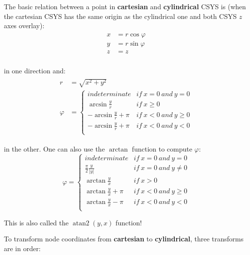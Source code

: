 \documentclass[10pt,b5paper,titlepage]{book}
\DeclareMathOperator{\atantwo}{atan2}
\newenvironment{eqarray}
{
    \begin{eqnarray}
        \begin{aligned}
}
{
        \end{aligned}
    \end{eqnarray}
}
\begin{document}
The basic relation between a point in \textbf{cartesian} and \textbf{cylindrical}
CSYS is (when the cartesian CSYS has the same origin as the cylindrical one
and both CSYS $ z $ axes overlay):
\begin{eqarray}
    x &= r \cos \varphi \\
    y &= r \sin \varphi \\
    z &= z \\
\end{eqarray}

 in one direction and:
 \begin{eqarray}
     r &= \sqrt{x^2 + y^2} \\
     \varphi &= \left\{ \begin{array}{cc}
                indeterminate & if\ x = 0\ and\ y = 0 \\
                \arcsin \frac{y}{r} & if\ x \ge 0 \\
                -\arcsin \frac{y}{r} + \pi & if\ x < 0\ and\ y \ge 0 \\
                -\arcsin \frac{y}{r} + \pi & if\ x < 0\ and\ y < 0 \\
             \end{array} \right.
 \end{eqarray}

 in the other. One can also use the $ \arctan $ function to compute $ \varphi $:
 \begin{equation}
     \varphi = \left\{ \begin{array}{cc}
             indeterminate & if\ x = 0\ and\ y = 0 \\
             \frac{\pi}{2}\frac{y}{|y|} & if\ x = 0\ and\ y \ne 0 \\
             \arctan \frac{y}{x} & if\ x > 0 \\
             \arctan \frac{y}{x} + \pi & if\ x < 0\ and\ y \ge 0 \\
             \arctan \frac{y}{x} - \pi & if\ x < 0\ and\ y < 0 \\
         \end{array} \right.
 \end{equation}

 This is also called the $ \atantwo (y, x) $ function!

 To transform node coordinates from \textbf{cartesian} to \textbf{cylindrical},
 three transforms are in order:
\end{document}
